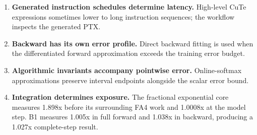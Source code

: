 \begin{enumerate}[leftmargin=1.4em]
    \item \textbf{Generated instruction schedules determine latency.}
    High-level CuTe expressions sometimes lower to long instruction sequences;
    the workflow inspects the generated PTX.
    \item \textbf{Backward has its own error profile.} Direct backward fitting
    is used when the differentiated forward approximation exceeds the training
    error budget.
    \item \textbf{Algorithmic invariants accompany pointwise error.}
    Online-softmax approximations preserve interval endpoints alongside the
    scalar error bound.
    \item \textbf{Integration determines exposure.} The fractional
    exponential core measures 1.898x before its surrounding FA4 work and
    1.0008x at the model step. B1 measures 1.005x in full forward and 1.038x
    in backward, producing a 1.027x complete-step result.
\end{enumerate}
